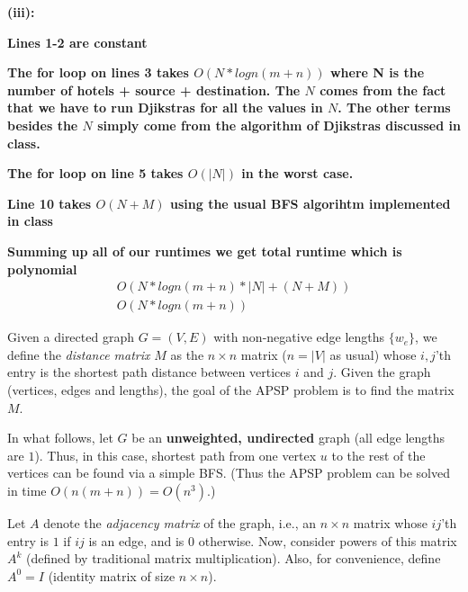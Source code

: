 \documentclass[addpoints]{exam}
\def\mysolution#1{}    %
\begin{document}
\begin{questions}
\textbf{(iii): }

\textbf{Lines 1-2 are constant}

\textbf{The for loop on lines 3 takes $O(N * logn(m+n))$  where N is the number of hotels + source + destination. The $N$ comes from the fact that we have to run Djikstras for all the values in $N$. The other terms besides the $N$ simply come from the algorithm of Djikstras discussed in class.}

\textbf{The for loop on line 5 takes $O(|N|)$ in the worst case.}

\textbf{Line 10 takes $O(N + M)$ using the usual BFS algorihtm implemented in class}

\textbf{Summing up all of our runtimes we get total runtime which is polynomial}
\begin{align*}
O(N * logn(m+n) * |N| + (N + M)) \\
O(N * logn(m+n))
\end{align*}

\mysolution{

}

Given a directed graph $G = (V, E)$ with non-negative edge lengths $\{w_e\}$, we define the {\em distance matrix} $M$ as the $n \times n$ matrix ($n = |V|$ as usual) whose $i,j$'th entry is the shortest path distance between vertices $i$ and $j$. Given the graph (vertices, edges and lengths), the goal of the APSP problem is to find the matrix $M$.

In what follows, let $G$ be an {\bf unweighted, undirected} graph (all edge lengths are $1$). Thus, in this case, shortest path from one vertex $u$ to the rest of the vertices can be found via a simple BFS. (Thus the APSP problem can be solved in time $O(n(m+n)) = O(n^3)$.)

Let $A$ denote the {\em adjacency matrix} of the graph, i.e., an $n \times n$ matrix whose $ij$'th entry is $1$ if $ij$ is an edge, and is $0$ otherwise.  Now, consider powers of this matrix $A^k$ (defined by traditional matrix multiplication).  Also, for convenience, define $A^0 = I$ (identity matrix of size $n\times n$). 

\end{questions}
\end{document}
